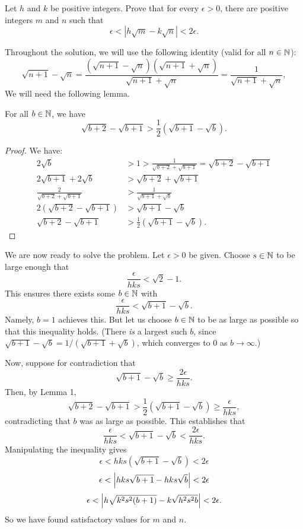 \begin{problem}[Putnam 2011 - B1]
Let $h$ and $k$ be positive integers. Prove that for every
$\epsilon > 0$, there are positive integers $m$ and $n$ such that
\[ \epsilon < |h \sqrt{m} - k \sqrt{n}| < 2\epsilon.  \]\end{problem}

Throughout the solution, we will use the following identity (valid for all $n \in \N$):
$$
\sqrt{n+1}-\sqrt{n} 
= \frac{(\sqrt{n+1}-\sqrt{n})(\sqrt{n+1}+\sqrt{n})}{\sqrt{n+1}+\sqrt{n}}
= \frac{1}{\sqrt{n+1} + \sqrt{n}},
$$
We will need the following lemma.
\begin{lem}
For all $b \in \N$, we have $$\sqrt{b+2} - \sqrt{b+1} > \frac{1}{2}(\sqrt{b+1} - \sqrt{b}).$$
\end{lem}
\begin{proof}
We have:
\begin{align*}
2\sqrt{b} &> 1 > \frac{1}{\sqrt{b+2} + \sqrt{b+1}} 
= \sqrt{b+2} - \sqrt{b+1}
\\
2\sqrt{b+1} + 2\sqrt{b} &> \sqrt{b+2} + \sqrt{b+1}
\\
\frac{2}{\sqrt{b+2} + \sqrt{b+1}} &> \frac{1}{\sqrt{b+1} + \sqrt{b}}
\\
2(\sqrt{b+2} - \sqrt{b+1}) &> \sqrt{b+1} - \sqrt{b}
\\
\sqrt{b+2} - \sqrt{b+1} &> \frac12(\sqrt{b+1} - \sqrt{b}).
\end{align*}
\end{proof}

We are now ready to solve the problem. Let $\epsilon > 0$ be given. Choose $s \in \N$ to be large enough that $$\frac{\epsilon}{hks} < \sqrt{2}-1.$$
This ensures there exists some $b \in \N$ with $$\frac{\epsilon}{hks} < \sqrt{b+1}-\sqrt{b}.$$ Namely, $b = 1$ achieves this. But let us choose $b \in \N$ to be as large as possible so that this inequality holds. (There \textit{is} a largest such $b$, since $\sqrt{b+1}-\sqrt{b} = 1/(\sqrt{b+1}+\sqrt{b})$, which converges to 0 as $b \rightarrow \infty$.)

Now, suppose for contradiction that $$\sqrt{b+1} - \sqrt{b} \geq \frac{2\epsilon}{hks}.$$ Then, by Lemma 1, $$\sqrt{b+2} - \sqrt{b+1} > \frac{1}{2}(\sqrt{b+1} - \sqrt{b}) \geq \frac{\epsilon}{hks},$$ contradicting that $b$ was as large as possible. This establishes that
$$\frac{\epsilon}{hks} < \sqrt{b+1}-\sqrt{b} < \frac{2\epsilon}{hks}.$$
Manipulating the inequality gives
$$\epsilon < hks(\sqrt{b+1}-\sqrt{b}) < 2\epsilon$$
$$\epsilon < \abs*{hks\sqrt{b+1}-hks\sqrt{b}} < 2\epsilon$$
$$\epsilon < \abs*{h\sqrt{k^2s^2(b+1)}-k\sqrt{h^2s^2b}} < 2\epsilon.$$
So we have found satisfactory values for $m$ and $n$.